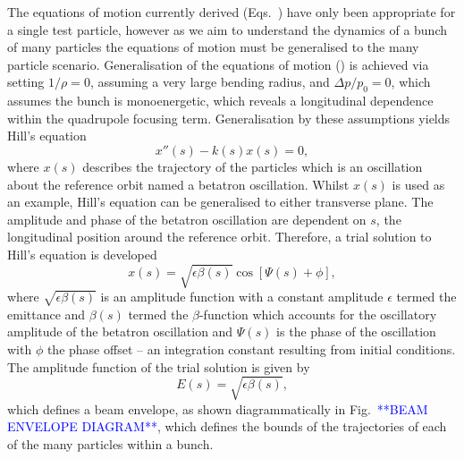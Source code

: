 \documentclass[../main.tex]{subfiles}
\begin{document}
The equations of motion currently derived (Eqs.~) have only been appropriate for a single test particle, however as we aim to understand the dynamics of a bunch of many particles the equations of motion must be generalised to the many particle scenario. Generalisation of the equations of motion () is achieved via setting $1/\rho=0$, assuming a very large bending radius, and $\Delta p/p_{0}=0$, which assumes the bunch is monoenergetic, which reveals a longitudinal dependence within the quadrupole focusing term. Generalisation by these assumptions yields Hill's equation
\begin{equation}
x''\left(s\right)-k\left(s\right)x\left(s\right) = 0,
\label{eq:Hills_equation}    
\end{equation}
where $x\left(s\right)$ describes the trajectory of the particles which is an oscillation about the reference orbit named a betatron oscillation. Whilst $x\left(s\right)$ is used as an example, Hill's equation can be generalised to either transverse plane. The amplitude and phase of the betatron oscillation are dependent on $s$, the longitudinal position around the reference orbit. Therefore, a trial solution to Hill's equation is developed 
\begin{equation}
x\left(s\right) = \sqrt{\epsilon\beta\left(s\right)}\cos\left[\Psi\left(s\right)+\phi\right],
\label{eq:Hills_trial_solution}    
\end{equation}
where $\sqrt{\epsilon\beta\left(s\right)}$ is an amplitude function with a constant amplitude $\epsilon$ termed the emittance and $\beta\left(s\right)$ termed the $\beta$-function which accounts for the oscillatory amplitude of the betatron oscillation and $\Psi\left(s\right)$ is the phase of the oscillation with $\phi$ the phase offset -- an integration constant resulting from initial conditions. The amplitude function of the trial solution is given by
\begin{equation}
E\left(s\right) = \sqrt{\epsilon\beta\left(s\right)},
\label{eq:envelope_function}    
\end{equation}
which defines a beam envelope, as shown diagrammatically in Fig.~\textcolor{blue}{**BEAM ENVELOPE DIAGRAM**}, which defines the bounds of the trajectories of each of the many particles within a bunch. 
\end{document}

